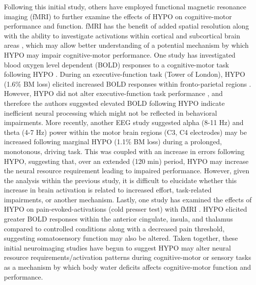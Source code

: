 Following this initial study, others have employed functional magnetic resonance imaging (fMRI) to further examine the effects of HYPO on cognitive-motor performance and function. fMRI has the benefit of added spatial resolution along with the ability to investigate activations within cortical and subcortical brain areas \cite{mehta_neuroergonomics:_2013}, which may allow better understanding of a potential mechanism by which HYPO may impair cognitive-motor performance. One study has investigated blood oxygen level dependent (BOLD) responses to a cognitive-motor task following HYPO \cite{kempton_dehydration_2011}. During an executive-function task (Tower of London), HYPO (1.6\% BM loss) elicited increased BOLD responses within fronto-parietal regions \cite{kempton_dehydration_2011}. However, HYPO did not alter executive-function task performance \cite{kempton_dehydration_2011}, and therefore the authors suggested elevated BOLD following HYPO indicate inefficient neural processing which might not be reflected in behavioral impairments. More recently, another EEG study \cite{watson_mild_2015} suggested alpha (8-11 Hz) and theta (4-7 Hz) power within the motor brain regions (C3, C4 electrodes) may be increased following marginal HYPO (1.1\% BM loss) during a prolonged, monotonous, driving task. This was coupled with an increase in errors following HYPO, suggesting that, over an extended (120 min) period, HYPO may increase the neural resource requirement leading to impaired performance. However, given the analysis within the previous study, it is difficult to elucidate whether this increase in brain activation is related to increased effort, task-related impairments, or another mechanism. Lastly, one study has examined the effects of HYPO on pain-evoked-activations (cold presser test) with fMRI \cite{ogino_dehydration_2014}. HYPO elicited greater BOLD responses within the anterior cingulate, insula, and thalamus compared to controlled conditions along with a decreased pain threshold, suggesting somatosensory function may also be altered. Taken together, these initial neuroimaging studies have begun to suggest HYPO may alter neural resource requirements/activation patterns during cognitive-motor or sensory tasks as a mechanism by which body water deficits affects cognitive-motor function and performance.


